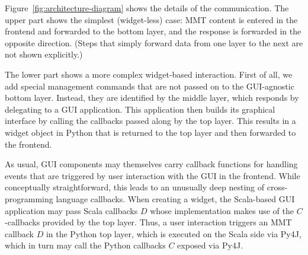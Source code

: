 Figure~\ref{fig:architecture-diagram} shows the details of the communication.
The upper part shows the simplest (widget-less) case: MMT content is entered in the frontend and forwarded to the bottom layer, and the response is forwarded in the opposite direction. (Steps that simply forward data from one layer to the next are not shown explicitly.)

The lower part shows a more complex widget-based interaction.
First of all, we add special management commands that are not passed on to the GUI-agnostic bottom layer.
Instead, they are identified by the middle layer, which responds by delegating to a GUI application.
This application then builds its graphical interface by calling the callbacks passed along by the top layer.
This results in a widget object in Python that is returned to the top layer and then forwarded to the frontend.

As usual, GUI components may themselves carry callback functions for handling events that are triggered by user interaction with the GUI in the frontend.
While conceptually straightforward, this leads to an unusually deep nesting of cross-programming language callbacks.
When creating a widget, the Scala-based GUI application may pass Scala callbacks $D$ whose implementation makes use of the $C$-callbacks provided by the top layer.
Thus, a user interaction triggers an MMT callback $D$ in the Python top layer, which is executed on the Scala side via Py4J, which in turn may call the Python callbacks $C$ exposed via Py4J.

%
%

